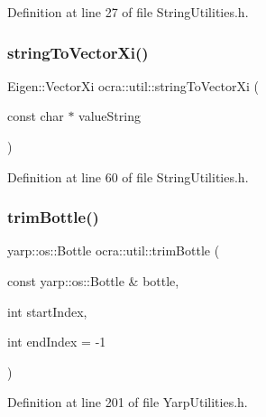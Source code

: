Definition at line 27 of file String\+Utilities.\+h.

\hypertarget{namespaceocra_1_1util_a9ae02be8142f960af91a4db9bbf78820}{}\label{namespaceocra_1_1util_a9ae02be8142f960af91a4db9bbf78820} 
\subsubsection{\texorpdfstring{string\+To\+Vector\+Xi()}{stringToVectorXi()}}
{\footnotesize\ttfamily Eigen\+::\+Vector\+Xi ocra\+::util\+::string\+To\+Vector\+Xi (\begin{DoxyParamCaption}\item[{const char $\ast$}]{value\+String }\end{DoxyParamCaption})\hspace{0.3cm}{\ttfamily [inline]}}



Definition at line 60 of file String\+Utilities.\+h.

\hypertarget{namespaceocra_1_1util_a1cf3abfc2f03c824eb23f3881acfc7de}{}\label{namespaceocra_1_1util_a1cf3abfc2f03c824eb23f3881acfc7de} 
\subsubsection{\texorpdfstring{trim\+Bottle()}{trimBottle()}}
{\footnotesize\ttfamily yarp\+::os\+::\+Bottle ocra\+::util\+::trim\+Bottle (\begin{DoxyParamCaption}\item[{const yarp\+::os\+::\+Bottle \&}]{bottle,  }\item[{int}]{start\+Index,  }\item[{int}]{end\+Index = {\ttfamily -\/1} }\end{DoxyParamCaption})\hspace{0.3cm}{\ttfamily [inline]}}



Definition at line 201 of file Yarp\+Utilities.\+h.

